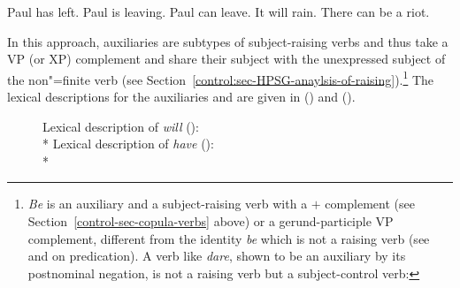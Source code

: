 	
\begin{exe}
\ex \begin{xlist}
\ex Paul has left.
\ex Paul is leaving.
\ex Paul can leave.
\ex It will rain.
\ex There can be a riot.
\end{xlist}	
\end{exe}

In this approach,  auxiliaries are subtypes of subject-raising verbs and thus take a VP (or
XP) complement and share their subject with the unexpressed subject of the non"=finite verb (see Section~\ref{control:sec-HPSG-anaylsis-of-raising}).\footnote{ \emph{Be} is an auxiliary and a subject-raising verb with a \prd$+$ complement (see
  Section~\ref{control-sec-copula-verbs} above) or a gerund-participle VP complement,
  different from the identity \emph{be} which is not a raising verb (see \citealp{VanEynde2008a} and
  \citealp{MuellerPredication} on predication). A verb like \emph{dare}, shown to be an auxiliary by
  its postnominal negation, is not a raising verb but a subject-control verb:
\eal
{}
\zllast
}
The lexical descriptions for the auxiliaries  and  are given in () and
().
\largerpage[-1]

\begin{figure}
\ea
Lexical description of \emph{will} ():\\*
\z
\eas
Lexical description of \emph{have} ():\\*
\zs
\vspace{-\baselineskip}
\end{figure}

